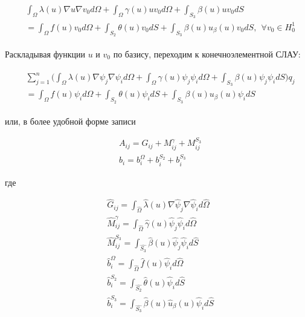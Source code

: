 \documentclass[12pt]{article}
\begin{document}
\begin{align}
  \begin{split}
    &\int_{\Omega}\lambda(u)\nabla u \nabla v_0 d\Omega +
    \int_{\Omega}\gamma(u)uv_0 d\Omega +
    \int_{S_3}\beta(u)uv_0 dS \\
    &= \int_{\Omega}f(u)v_0 d\Omega +
    \int_{S_2}\theta(u)v_0 dS +
    \int_{S_3}\beta(u)u_{\beta}(u)v_0 dS, \ \ \forall v_0 \in H_0^1
  \end{split}
\end{align}

\vskip 2mm
\noindent Раскладывая функции $u$ и $v_0$ по базису, переходим 
к конечноэлементной СЛАУ:

\begin{align}
  \begin{split}
    &\sum_{j=1}^{n}\big(
      \int_{\Omega}\lambda(u)\nabla \psi_j \nabla \psi_i d\Omega +
      \int_{\Omega}\gamma(u) \psi_j \psi_i d\Omega +
      \int_{S_3}\beta(u) \psi_j \psi_i dS
    \big)q_j \\
    &= \int_{\Omega}f(u) \psi_i d\Omega +
    \int_{S_2}\theta(u) \psi_i dS +
    \int_{S_3}\beta(u)u_{\beta}(u) \psi_i dS
  \end{split}
\end{align}

\vskip 2mm
\noindent или, в более удобной форме записи

\begin{align*}
  &A_{ij} = G_{ij} + M^{\gamma}_{ij} + M^{S_3}_{ij} \\
  &b_{i} = b^{\Omega}_{i} + b^{S_2}_{i} + b^{S_3}_{i}
\end{align*}

\vskip 2mm
\noindent где

\begin{align}
  &\hat{G}_{ij} = \int_{\hat{\Omega}}\hat{\lambda}(u)\nabla\hat{\psi}_j\nabla\hat{\psi}_i d\hat{\Omega} \\
  &\hat{M}^{\gamma}_{ij} = \int_{\hat{\Omega}}\hat{\gamma}(u)\hat{\psi}_j\hat{\psi}_i d\hat{\Omega} \\
  &\hat{M}^{S_3}_{ij} = \int_{\hat{S_3}}\hat{\beta}(u)\hat{\psi}_j\hat{\psi}_i d\hat{S} \\
  &\hat{b}^{\Omega}_{i} = \int_{\hat{\Omega}}\hat{f}(u)\hat{\psi}_i d\hat{\Omega} \\
  &\hat{b}^{S_2}_{i} = \int_{\hat{S_2}}\hat{\theta}(u)\hat{\psi}_i d\hat{S} \\
  &\hat{b}^{S_3}_{i} = \int_{\hat{S_3}}\hat{\beta}(u)\hat{u}_{\beta}(u)\hat{\psi}_i d\hat{S}
\end{align}
\end{document}
